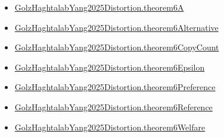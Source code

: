 \documentclass[10pt]{article}
\begin{document}
\begin{itemize}
\item \hyperlink{governing-declaration-7b9a203f54b7d337}{Golz\allowbreak{}Haghtalab\allowbreak{}Yang2025\allowbreak{}Distortion.\allowbreak{}theorem6\allowbreak{}A}
\item \hyperlink{governing-declaration-3451d41a5ff413f7}{Golz\allowbreak{}Haghtalab\allowbreak{}Yang2025\allowbreak{}Distortion.\allowbreak{}theorem6\allowbreak{}Alternative}
\item \hyperlink{governing-declaration-a14b7af0e1436262}{Golz\allowbreak{}Haghtalab\allowbreak{}Yang2025\allowbreak{}Distortion.\allowbreak{}theorem6\allowbreak{}Copy\allowbreak{}Count}
\item \hyperlink{governing-declaration-2108be1d9586e812}{Golz\allowbreak{}Haghtalab\allowbreak{}Yang2025\allowbreak{}Distortion.\allowbreak{}theorem6\allowbreak{}Epsilon}
\item \hyperlink{governing-declaration-b14cd971fad8513c}{Golz\allowbreak{}Haghtalab\allowbreak{}Yang2025\allowbreak{}Distortion.\allowbreak{}theorem6\allowbreak{}Preference}
\item \hyperlink{governing-declaration-0527d6356fcaa0f2}{Golz\allowbreak{}Haghtalab\allowbreak{}Yang2025\allowbreak{}Distortion.\allowbreak{}theorem6\allowbreak{}Reference}
\item \hyperlink{governing-declaration-ea43bde8cd383b24}{Golz\allowbreak{}Haghtalab\allowbreak{}Yang2025\allowbreak{}Distortion.\allowbreak{}theorem6\allowbreak{}Welfare}
\end{itemize}
\end{document}
